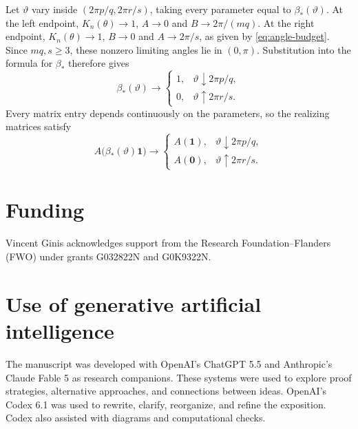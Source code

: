 \documentclass[11pt,a4paper]{article}
\theoremstyle{definition}
\theoremstyle{remark}
\numberwithin{equation}{section}
\begin{document}
Let $\vartheta$ vary inside $(2\pi p/q,2\pi r/s)$, taking every parameter equal to $\beta_*(\vartheta)$. At the left endpoint, $K_n(\theta)\to1$, $A\to0$ and $B\to2\pi/(mq)$. At the right endpoint, $K_n(\theta)\to1$, $B\to0$ and $A\to2\pi/s$, as given by \eqref{eq:angle-budget}. Since $mq,s\ge3$, these nonzero limiting angles lie in $(0,\pi)$. Substitution into the formula for $\beta_*$ therefore gives
\[
 \beta_*(\vartheta)\longrightarrow
 \begin{cases}
 1,&\vartheta\downarrow2\pi p/q,\\
 0,&\vartheta\uparrow2\pi r/s.
 \end{cases}
\]
Every matrix entry depends continuously on the parameters, so the realizing matrices satisfy
\[
 A\bigl(\beta_*(\vartheta)\mathbf1\bigr)\longrightarrow
 \begin{cases}
 A(\mathbf1),&\vartheta\downarrow2\pi p/q,\\
 A(\mathbf0),&\vartheta\uparrow2\pi r/s.
 \end{cases}
\]


\section*{Funding}
Vincent Ginis acknowledges support from the Research Foundation--Flanders
(FWO) under grants G032822N and G0K9322N.

\section*{Use of generative artificial intelligence}
The manuscript was developed with OpenAI's ChatGPT 5.5 and Anthropic's Claude Fable 5 as research companions. These systems were used to explore proof strategies, alternative approaches, and connections between ideas. OpenAI's Codex 6.1 was used to rewrite, clarify, reorganize, and refine the exposition. Codex also assisted with diagrams and computational checks.

\end{document}
